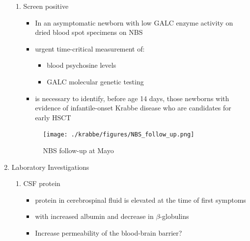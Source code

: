 \documentclass{scrartcl}
\begin{document}
\begin{enumerate}
\begin{enumerate}
\item Screen positive
\label{sec:org6be2dd3}
\begin{itemize}
\item In an asymptomatic newborn with low GALC enzyme activity
on dried blood spot specimens on NBS
\item urgent time-critical measurement of:
\begin{itemize}
\item blood psychosine levels
\item GALC molecular genetic testing
\end{itemize}
\item is necessary to identify, before age 14 days, those newborns with
evidence of infantile-onset Krabbe disease who are candidates for
early HSCT
\end{itemize}

\begin{figure}[htbp]
\centering
\texttt{[image: ./krabbe/figures/NBS\_follow\_up.png]}
\caption{\label{fig:orgfd2798b}
NBS follow-up at Mayo}
\end{figure}
\end{enumerate}

\item Laboratory Investigations
\label{sec:org065d149}
\begin{enumerate}
\item CSF protein
\label{sec:org90572c9}
\begin{itemize}
\item protein in cerebrospinal fluid is elevated at the time of first symptoms
\item with increased albumin and decrease in \(\beta\)-globulins
\item Increase permeability of the blood-brain barrier?
\end{itemize}


\end{enumerate}
\end{enumerate}
\end{document}
